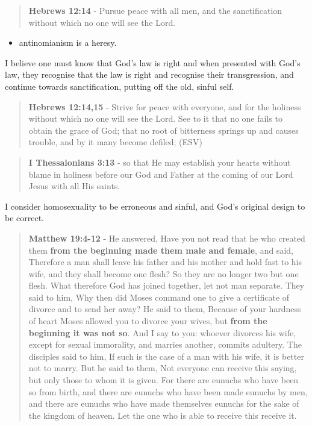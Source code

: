 \documentclass[11pt]{article}
\begin{document}
\begin{quote}
\textbf{Hebrews 12:14} - Pursue peace with all men, and the sanctification without which no one will see the Lord.
\end{quote}

\begin{itemize}
\item antinomianism is a heresy.
\end{itemize}

I believe one must know that God's law is
right and when presented with God's law, they
recognise that the law is right and recognise
their transgression, and continue towards
sanctification, putting off the old, sinful
self.

\begin{quote}
\textbf{Hebrews 12:14,15} -  Strive for peace with everyone, and for the holiness without which no one will see the Lord.  See to it that no one fails to obtain the grace of God; that no root of bitterness springs up and causes trouble, and by it many become defiled;  (ESV)
\end{quote}

\begin{quote}
\textbf{I Thessalonians 3:13} - so that He may establish your hearts without blame in holiness before our God and Father at the coming of our Lord Jesus with all His saints.
\end{quote}

I consider homosexuality to be erroneous and sinful, and God's original design to be correct.

\begin{quote}
\textbf{Matthew 19:4-12} - He answered, Have you not read that he who created them \textbf{from the beginning made them male and female}, and said, Therefore a man shall leave his father and his mother and hold fast to his wife, and they shall become one flesh?  So they are no longer two but one flesh. What therefore God has joined together, let not man separate.  They said to him, Why then did Moses command one to give a certificate of divorce and to send her away?  He said to them, Because of your hardness of heart Moses allowed you to divorce your wives, but \textbf{from the beginning it was not so}.  And I say to you: whoever divorces his wife, except for sexual immorality, and marries another, commits adultery.  The disciples said to him, If such is the case of a man with his wife, it is better not to marry.  But he said to them, Not everyone can receive this saying, but only those to whom it is given.  For there are eunuchs who have been so from birth, and there are eunuchs who have been made eunuchs by men, and there are eunuchs who have made themselves eunuchs for the sake of the kingdom of heaven. Let the one who is able to receive this receive it.
\end{quote}
\end{document}
